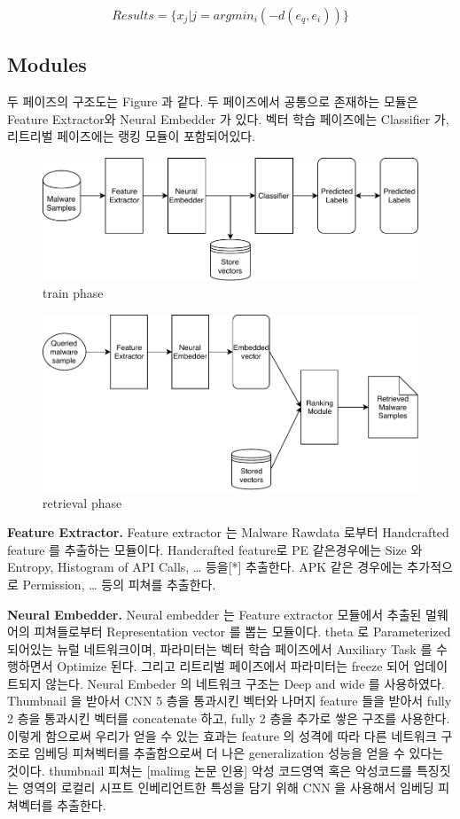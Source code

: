 \[
Results = \{x_j | j = argmin_i( {-d(e_q, e_i)} )  \}
\]


\subsection{Modules}
두 페이즈의 구조도는 Figure 과 같다. 두 페이즈에서 공통으로 존재하는 모듈은 Feature Extractor와 Neural Embedder 가 있다. 벡터 학습 페이즈에는 Classifier 가, 리트리벌 페이즈에는 랭킹 모듈이 포함되어있다. 
\begin{figure}
  \includegraphics[width=\linewidth]{../figures/train_phase.pdf}
  \caption{train phase}
  \label{fig:one}
\end{figure}
\begin{figure}
  \includegraphics[width=\linewidth]{../figures/retrieval_phase.pdf}
  \caption{retrieval phase}
  \label{fig:two}
\end{figure}

\textbf{Feature Extractor. }
Feature extractor 는 Malware Rawdata 로부터 Handcrafted feature 를 추출하는 모듈이다. Handcrafted feature로 PE 같은경우에는 Size 와 Entropy, Histogram of API Calls, … 등을[*] 추출한다. APK 같은 경우에는 추가적으로 Permission,  … 등의 피쳐를 추출한다. 

\textbf{Neural Embedder. }
Neural embedder 는 Feature extractor 모듈에서 추출된 멀웨어의 피쳐들로부터 Representation vector 를 뽑는 모듈이다. theta 로 Parameterized 되어있는 뉴럴 네트워크이며, 파라미터는 벡터 학습 페이즈에서 Auxiliary Task 를 수행하면서 Optimize 된다. 그리고 리트리벌 페이즈에서 파라미터는 freeze 되어 업데이트되지 않는다. 
Neural Embeder 의 네트워크 구조는 Deep and wide 를 사용하였다. Thumbnail 을 받아서 CNN 5 층을 통과시킨 벡터와 나머지 feature 들을 받아서 fully 2 층을 통과시킨 벡터를 concatenate 하고, fully 2 층을 추가로 쌓은 구조를 사용한다. 이렇게 함으로써 우리가 얻을 수 있는 효과는 feature 의 성격에 따라 다른 네트워크 구조로 임베딩 피쳐벡터를 추출함으로써 더 나은 generalization 성능을 얻을 수 있다는 것이다. thumbnail 피쳐는 [malimg 논문 인용] 악성 코드영역 혹은 악성코드를 특징짓는 영역의 로컬리 시프트 인베리언트한 특성을 담기 위해 CNN 을 사용해서 임베딩 피쳐벡터를 추출한다. 

